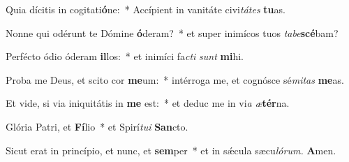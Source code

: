\item Quia dícitis in cogitati\textbf{ó}ne:~* Accípient in vanitáte civi\textit{tátes} \textbf{tu}as.
\item Nonne qui odérunt te Dómine \textbf{ó}deram?~* et super inimícos tuos \textit{tabe}\textbf{scé}bam?
\item Perfécto ódio óderam \textbf{il}los:~* et inimíci fa\textit{cti} \textit{sunt} \textbf{mi}hi.
\item Proba me Deus, et scito cor \textbf{me}um:~* intérroga me, et cognósce sé\textit{mitas} \textbf{me}as.
\item Et vide, si via iniquitátis in \textbf{me} est:~* et deduc me in vi\textit{a} \textit{æ}\textbf{tér}na.
\item Glória Patri, et \textbf{Fí}lio~* et Spirí\hspace*{0.03em}\textit{tui} \textbf{San}cto.
\item Sicut erat in princípio, et nunc, et \textbf{sem}per~* et in sǽcula sæcu\hspace*{0.03em}\textit{lórum.} \textbf{A}men.
